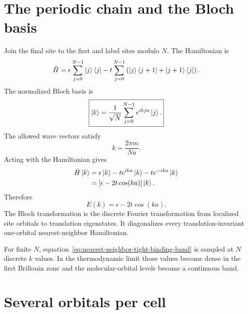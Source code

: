 \section{The periodic chain and the Bloch basis}

Join the final site to the first and label sites modulo $N$.  The Hamiltonian is
\begin{equation}
  \hat H
  =\epsilon\sum_{j=0}^{N-1}\ket j\bra j
  -t\sum_{j=0}^{N-1}
   \left(
     \ket j\bra{j+1}
    +\ket{j+1}\bra j
   \right).
  \label{eq:periodic-chain-tight-binding-hamiltonian}
\end{equation}
The normalized Bloch basis is
\begin{equation}
  \boxed{
  \ket k
  =\frac{1}{\sqrt N}
   \sum_{j=0}^{N-1}e^{ikja}\ket j.
  }
  \label{eq:tight-binding-bloch-basis}
\end{equation}
The allowed wave vectors satisfy
\begin{equation}
  k=\frac{2\pi m}{Na}.
  \label{eq:tight-binding-allowed-k}
\end{equation}
Acting with the Hamiltonian gives
\begin{equation}
\begin{aligned}
  \hat H\ket k
  &=\epsilon\ket k
    -t e^{ika}\ket k
    -t e^{-ika}\ket k\\
  &=\left[\epsilon-2t\cos(ka)\right]\ket k.
\end{aligned}
  \label{eq:tight-binding-bloch-diagonalization}
\end{equation}
Therefore
\begin{equation}
  \boxed{
  E(k)=\epsilon-2t\cos(ka).
  }
  \label{eq:nearest-neighbor-tight-binding-band}
\end{equation}
The Bloch transformation is the discrete Fourier transformation from localized
site orbitals to translation eigenstates.  It diagonalizes every
translation-invariant one-orbital nearest-neighbor Hamiltonian.

For finite $N$, equation~\eqref{eq:nearest-neighbor-tight-binding-band} is
sampled at $N$ discrete $k$ values.  In the thermodynamic limit those values
become dense in the first Brillouin zone and the molecular-orbital levels become
a continuous band.

\section{Several orbitals per cell}

